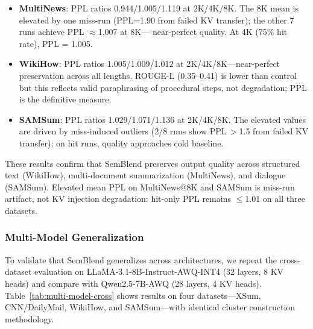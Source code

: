 \documentclass[10pt,twocolumn]{article}
\begin{document}
\begin{itemize}[noitemsep,topsep=2pt]
\item \textbf{MultiNews}: PPL ratios 0.944/1.005/1.119 at 2K/4K/8K.
  The 8K mean is elevated by one miss-run (PPL=1.90 from failed KV
  transfer); the other 7 runs achieve PPL $\approx$1.007 at 8K---
  near-perfect quality. At 4K (75\% hit rate), PPL = 1.005.
\item \textbf{WikiHow}: PPL ratios 1.005/1.009/1.012 at
  2K/4K/8K---near-perfect preservation across all lengths. ROUGE-L
  (0.35--0.41) is lower than control but this reflects valid
  paraphrasing of procedural steps, not degradation; PPL is the
  definitive measure.
\item \textbf{SAMSum}: PPL ratios 1.029/1.071/1.136 at 2K/4K/8K.
  The elevated values are driven by miss-induced outliers (2/8 runs
  show PPL\,$>$1.5 from failed KV transfer); on hit runs, quality
  approaches cold baseline.
\end{itemize}

These results confirm that SemBlend preserves output quality across
structured text (WikiHow), multi-document summarization (MultiNews), and
dialogue (SAMSum). Elevated mean PPL on MultiNews@8K and SAMSum is
miss-run artifact, not KV injection degradation: hit-only PPL remains
${\leq}1.01$ on all three datasets.

\subsubsection{Multi-Model Generalization}
\label{sec:multi-model-real}

To validate that SemBlend generalizes across architectures, we repeat
the cross-dataset evaluation on LLaMA-3.1-8B-Instruct-AWQ-INT4
(32 layers, 8 KV heads) and compare with Qwen2.5-7B-AWQ (28 layers,
4 KV heads). Table~\ref{tab:multi-model-cross} shows results on four
datasets---XSum, CNN/DailyMail, WikiHow, and SAMSum---with identical
cluster construction methodology.
\end{document}
